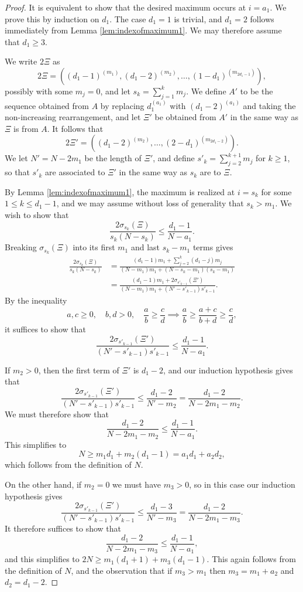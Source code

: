 \documentclass{amsart}
\newcommand{\f}{\frac}
\newcommand{\1}{\m 1}
\theoremstyle{remark}
\theoremstyle{definition}
\numberwithin{equation}{subsection}
\begin{document}
\begin{proof}

It is equivalent to show that the desired maximum occurs at $i = a_1$.  We prove this by induction on $d_1$.  The case $d_1 = 1$ is trivial, and $d_1 = 2$ follows immediately from Lemma \ref{lem:indexofmaximum1}.  We may therefore assume that $d_1 \ge 3$.

We write $2\Xi$ as
\[
2\Xi = ((d_1 - 1)^{(m_{1})}, (d_1 - 2)^{(m_{2})}, \dotsc, (1 - d_1)^{(m_{2d_1 - 1} )} ), 
\]
possibly with some $m_j = 0$, and let $s_k = \sum_{j= 1}^k m_j$.  We define $A'$ to be the sequence obtained from $A$ by replacing $d_1^{(a_1)}$ with $(d_1-2)^{(a_1)}$ and taking the non-increasing rearrangement, and let $\Xi'$ be obtained from $A'$ in the same way as $\Xi$ is from $A$.  It follows that
\[
2\Xi' = ((d_1 - 2)^{(m_{2})}, \dotsc, (2 - d_1)^{(m_{2d_1 - 2} )} ).
\]
We let $N' = N - 2m_1$ be the length of $\Xi'$, and define $s'_k = \sum_{j= 2}^{k+1} m_j$ for $k \ge 1$, so that $s'_k$ are associated to $\Xi'$ in the same way as $s_k$ are to $\Xi$.

By Lemma \ref{lem:indexofmaximum1}, the maximum is realized at $i = s_k$ for some $1 \le k \le d_1 - 1$, and we may assume without loss of generality that $s_k > m_1$.  We wish to show that
\[
\f{2\sigma_{s_k}(\Xi)}{s_k(N-s_k)} \le \frac{d_1 - 1}{N - a_1}.
\]
Breaking $\sigma_{s_k}(\Xi)$ into its first $m_1$ and last $s_k - m_1$ terms gives
\begin{align*}
\f{2\sigma_{s_k}(\Xi)}{s_k(N-s_k)} & = \frac{ (d_1-1)m_1 + \sum_{j=2}^k (d_1 - j) m_j }{  (N - m_1)m_1 + (N - s_k - m_1)(s_k - m_1) } \\
& = \frac{ (d_1-1)m_1 + 2\sigma_{s'_{k-1}}(\Xi') }{  (N - m_1)m_1 + (N' - s'_{k-1} )s'_{k-1} }.
\end{align*}
%
By the inequality
\begin{equation} \label{eq: dream function addition}
a,c \geq 0, \quad b,d > 0, \quad \f ab \geq \f cd \implies \f ab \geq \f{a + c}{b+d} \geq \f cd,
\end{equation}
%
it suffices to show that
\[
\frac{ 2\sigma_{s'_{k-1}}(\Xi')}{ (N' - s'_{k-1} )s'_{k-1} } \le \frac{d_1 - 1}{N - a_1}.
\]

If $m_2 > 0$, then the first term of $\Xi'$ is $d_1 - 2$, and our induction hypothesis gives that
\[
\frac{ 2\sigma_{s'_{k-1}}(\Xi')}{ (N' - s'_{k-1} )s'_{k-1} } \le \frac{d_1 - 2}{N' - m_2} = \frac{d_1 - 2}{N - 2m_1 - m_2}.
\]
We must therefore show that
\[
\frac{d_1 - 2}{N - 2m_1 - m_2} \le \frac{d_1 - 1}{N - a_1}.
\]
This simplifies to
\[
N \ge m_1 d_1 + m_2(d_1 - 1) = a_1 d_1 + a_2 d_2,
\]
which follows from the definition of $N$.

On the other hand, if $m_2 = 0$ we must have $m_3 > 0$, so in this case our induction hypothesis gives
\[
\frac{ 2\sigma_{s'_{k-1}}(\Xi')}{ (N' - s'_{k-1} )s'_{k-1} } \le \frac{d_1 - 3}{N' - m_3} = \frac{d_1 - 2}{N - 2m_1 - m_3}.
\]
It therefore suffices to show that
\[
\frac{d_1 - 2}{N - 2m_1 - m_3} \le \frac{d_1 - 1}{N - a_1},
\]
and this simplifies to $2N \ge m_1(d_1+1) + m_3(d_1 - 1)$.  This again follows from the definition of $N$, and the observation that if $m_3 > m_1$ then $m_3 = m_1 + a_2$ and $d_2 = d_1 - 2$.
\end{proof}
\end{document}
